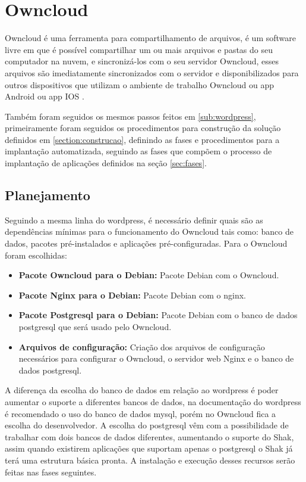 \section{Owncloud}
\label{sub:owncloud}

Owncloud é uma ferramenta para compartilhamento de arquivos, é um software 
livre em que é possível compartilhar
um ou mais arquivos e pastas do seu computador na nuvem, e sincronizá-los com o seu
servidor Owncloud, esses arquivos são imediatamente sincronizados com o servidor
e disponibilizados para outros dispositivos que utilizam o ambiente de trabalho
Owncloud ou app Android ou app IOS \cite{owncloud} .

Também foram seguidos os mesmos passos feitos em \ref{sub:wordpress}, primeiramente
foram seguidos os procedimentos para construção da solução definidos em \ref{section:construcao},
definindo as fases e procedimentos para a implantação automatizada, seguindo as
fases que compõem o processo de implantação de aplicações definidos na seção
\ref{sec:fases}.

\subsection{Planejamento}

Seguindo a mesma linha do wordpress, é necessário definir quais são as dependências
mínimas para o funcionamento do Owncloud tais como: banco de dados, pacotes
pré-instalados e aplicações pré-configuradas. Para o Owncloud foram escolhidas:

\begin{itemize}
   \item \textbf{Pacote Owncloud para o Debian:} Pacote Debian com o Owncloud.
   \item \textbf{Pacote Nginx para o Debian:} Pacote Debian com o nginx.
   \item \textbf{Pacote Postgresql para o Debian:} Pacote Debian com o banco de dados postgresql
   que será usado pelo Owncloud.
   \item \textbf{Arquivos de configuração:} Criação dos arquivos de configuração
   necessários para configurar o Owncloud, o servidor web Nginx e o banco de dados
   postgresql.
\end{itemize}

A diferença da escolha do banco de dados em relação ao wordpress é poder aumentar
o suporte a diferentes bancos de dados, na documentação do wordpress é recomendado
o uso do banco de dados mysql, porém no Owncloud fica a escolha do desenvolvedor.
A escolha do postgresql vêm com a possibilidade de trabalhar com dois bancos de
dados diferentes, aumentando o suporte do Shak, assim quando existirem aplicações
que suportam apenas o postgresql o Shak já terá uma estrutura básica pronta.
A instalação e execução desses recursos serão feitas nas fases seguintes.

